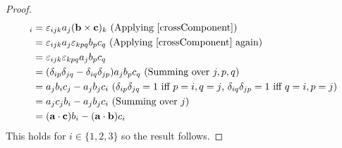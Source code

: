 \documentclass[../main.tex]{subfiles}
\begin{document}
\begin{proof}
  \begin{align*}
    [\vec{a} \times (\vec{b} \times \vec{c})]_i &= \levi_{ijk} a_j (\vec{b} \times \vec{c})_k \text{ (Applying \cref{crossComponent})} \\
                                                &= \levi_{ijk} a_j \levi_{kpq} b_p c_q \text{ (Applying \cref{crossComponent} again)}\\
                                                &= \levi_{ijk} \levi_{kpq} a_j b_p c_q \\
                                                &= (\delta_{i p} \delta_{j q} - \delta_{i q} \delta_{j p}) a_j b_p c_q \text{ (Summing over $j, p, q$)} \\
                                                &= a_j b_i c_j - a_j b_j c_i \text{ ($\delta_{i p} \delta_{j q} = 1$ iff $p = i, q = j$, $\delta_{i q}\delta_{j p} = 1$ iff $q = i, p = j$)}\\
                                                &= a_j c_j b_i - a_j b_j c_i \text{ (Summing over $j$)}\\
                                                &= (\vec{a} \cdot \vec{c})b_i - (\vec{a} \cdot \vec{b})c_i
  \end{align*}
  This holds for $i \in \{1, 2, 3\}$ so the result follows.
\end{proof}
\end{document}
